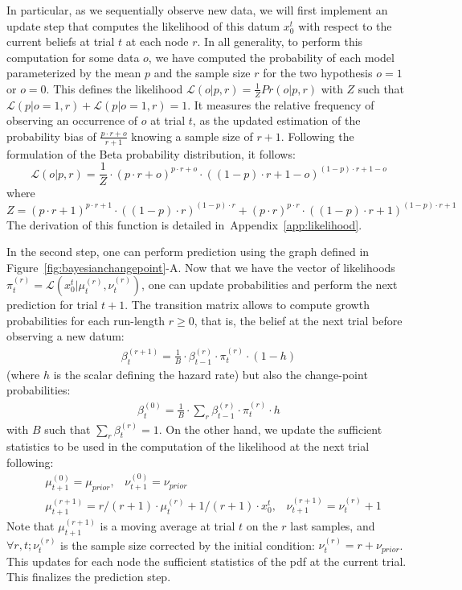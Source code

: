 \documentclass[12pt,english]{article}%
\newcommand{\eq}[1]{\begin{equation*}#1\end{equation*}}
\newcommand{\eql}[1]{\begin{equation}#1\end{equation}}
\newcommand{\eqa}[1]{\begin{align}#1\end{align}}
\newcommand{\Ll}{\mathcal{L}}
\newcommand{\seeFig}[1]{Figure~\ref{fig:#1}}
\newcommand{\seeApp}[1]{Appendix~\ref{app:#1}}
\begin{document}
In particular, as we sequentially observe new data,
we will first implement an update step that
computes the likelihood of this datum $x_0^t$ with respect to
the current beliefs at trial $t$ at each node $r$.
In all generality, to perform this computation for some data $o$,
we have computed the probability of each model
parameterized by the mean $p$ and the sample size $r$
for the two hypothesis $o=1$ or $o=0$.
This defines the likelihood
$\Ll(o | p, r) = \frac{1}{Z} Pr(o |p, r)$
with $Z$ such that $\Ll(p | o=1, r) + \Ll(p | o=1, r)=1$.
It measures the relative frequency of observing an occurrence of $o$ at trial $t$,
as the updated estimation of the probability bias of $\frac{p\cdot r + o}{r+1}$
knowing a sample size of $r+1$.
Following the formulation of the Beta probability distribution, it follows:
\eql{%
\Ll(o | p, r) = \frac{1}{Z} \cdot {(p\cdot r + o)}^{p\cdot r + o} \cdot {((1- p)\cdot r + 1- o)}^{(1- p)\cdot r + 1- o}
\label{eq:likelihood}
}
where
\eq{
Z = {(p\cdot r + 1)}^{p\cdot r + 1}  \cdot {((1- p)\cdot r )}^{(1- p)\cdot r }  +
    {(p\cdot r )}^{p\cdot r }  \cdot {((1- p)\cdot r + 1)}^{(1- p)\cdot r + 1}
}
The derivation of this function is detailed in~\seeApp{likelihood}.

In the second step, one can perform prediction
using the graph defined in \seeFig{bayesianchangepoint}-A.
Now that we have the vector of likelihoods $\pi^{(r)}_t=\Ll(x_0^t |  \mu^{(r)}_{t}, \nu^{(r)}_{t})$,
one can update probabilities and perform the next prediction for trial $t+1$.
The transition matrix %
allows to compute growth probabilities for each run-length $r \geq 0$, 
that is, the belief at the next trial before observing a new datum:
\eqa{
\beta^{(r+1)}_t = \frac{1}{B} \cdot \beta^{(r)}_{t-1} \cdot \pi^{(r)}_{t} \cdot (1-h)
}
(where $h$ is the scalar defining the hazard rate)
but also the change-point probabilities:
\eqa{
\beta^{(0)}_t  = \frac{1}{B} \cdot \sum_{r} \beta^{(r)}_{t-1} \cdot \pi^{(r)}_{t} \cdot h
}
with $B$ such that $\sum_{r} \beta^{(r)}_{t} = 1$.
On the other hand, we update the sufficient statistics to be used 
in the computation of the likelihood at the next trial following:
\eqa{
& \mu^{(0)}_{t+1} = \mu_{prior} \text{,} \quad \nu^{(0)}_{t+1} = \nu_{prior} \\
& \mu^{(r+1)}_{t+1} = r/(r+1) \cdot \mu^{(r)}_{t} + 1/(r+1) \cdot x_0^t \text{,} \quad \nu^{(r+1)}_{t+1} = \nu^{(r)}_{t} + 1
}
Note that $\mu^{(r+1)}_{t+1}$ is a moving average at trial $t$ on the $r$ last samples,
and $\forall r, t; \nu^{(r)}_{t}$ is the sample size corrected by the initial condition:
$\nu^{(r)}_{t} = r + \nu_{prior}$.
This updates for each node the sufficient statistics of the pdf at the current trial.
This finalizes the prediction step.
\end{document}
